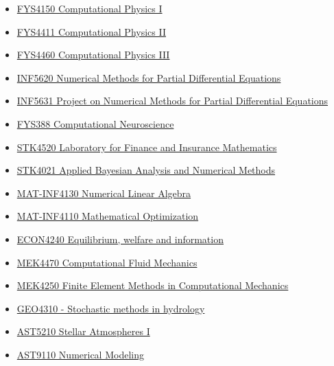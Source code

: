 \documentclass[%
oneside,                 %
final,                   %
10pt]{article}
\begin{document}
\begin{itemize}
\item \href{{http://www.uio.no/studier/emner/matnat/fys/FYS4150/index-eng.html}}{FYS4150 Computational Physics I}

\item \href{{http://www.uio.no/studier/emner/matnat/fys/FYS4411/}}{FYS4411 Computational Physics II}

\item \href{{http://www.uio.no/studier/emner/matnat/fys/FYS4460/}}{FYS4460 Computational Physics III}

\item \href{{http://www.uio.no/studier/emner/matnat/ifi/INF5620/index-eng.html}}{INF5620 Numerical Methods for Partial Differential Equations}

\item \href{{http://www.uio.no/studier/emner/matnat/ifi/INF5631/index-eng.html}}{INF5631 Project on Numerical Methods for Partial Differential Equations}

\item \href{{http://www.nmbu.no/course/FYS388}}{FYS388 Computational Neuroscience}

\item \href{{http://www.uio.no/studier/emner/matnat/math/STK4520/index-eng.html}}{STK4520 Laboratory for Finance and Insurance Mathematics}

\item \href{{http://www.uio.no/studier/emner/matnat/math/STK4021/index-eng.html}}{STK4021 Applied Bayesian Analysis and Numerical Methods}

\item \href{{http://www.uio.no/studier/emner/matnat/math/MAT-INF4130/index-eng.html}}{MAT-INF4130  Numerical Linear Algebra}

\item \href{{http://www.uio.no/studier/emner/matnat/math/MAT-INF4110/index.html}}{MAT-INF4110 Mathematical Optimization}

\item \href{{http://www.uio.no/studier/emner/sv/oekonomi/ECON4240/index.html}}{ECON4240 Equilibrium, welfare and information}

\item \href{{http://www.uio.no/studier/emner/matnat/math/MEK4470/index-eng.html}}{MEK4470  Computational Fluid Mechanics}

\item \href{{http://www.uio.no/studier/emner/matnat/math/MEK4250/index-eng.html}}{MEK4250 Finite Element Methods in Computational Mechanics}

\item \href{{http://www.uio.no/studier/emner/matnat/geofag/GEO4310/}}{GEO4310 - Stochastic methods in hydrology}

\item \href{{http://www.uio.no/studier/emner/matnat/astro/AST5210/index-eng.html}}{AST5210 Stellar Atmospheres I}

\item \href{{http://www.uio.no/studier/emner/matnat/astro/AST9110/index-eng.html}}{AST9110 Numerical Modeling}
\end{itemize}
\end{document}
